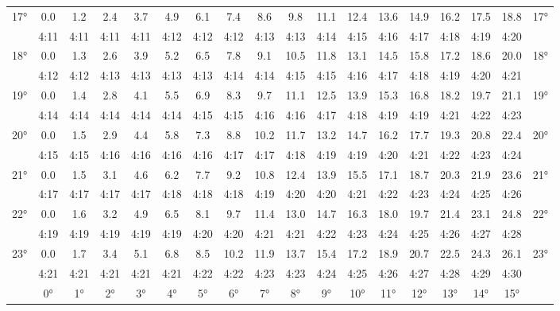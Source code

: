 \begin{footnotesize}
\begin{tabular}{c || c | c | c | c | c | c | c | c | c | c | c | c | c | c | c | c || c}
		\multirow{2}{*}{17°}&0.0&1.2&2.4&3.7&4.9&6.1&7.4&8.6&9.8&11.1&12.4&13.6&14.9&16.2&17.5&18.8&\multirow{2}{*}{17°}\\ \space&4:11&4:11&4:11&4:11&4:12&4:12&4:12&4:13&4:13&4:14&4:15&4:16&4:17&4:18&4:19&4:20&\space\\\hline
		\multirow{2}{*}{18°}&0.0&1.3&2.6&3.9&5.2&6.5&7.8&9.1&10.5&11.8&13.1&14.5&15.8&17.2&18.6&20.0&\multirow{2}{*}{18°}\\ \space&4:12&4:12&4:13&4:13&4:13&4:13&4:14&4:14&4:15&4:15&4:16&4:17&4:18&4:19&4:20&4:21&\space\\\hline
		\multirow{2}{*}{19°}&0.0&1.4&2.8&4.1&5.5&6.9&8.3&9.7&11.1&12.5&13.9&15.3&16.8&18.2&19.7&21.1&\multirow{2}{*}{19°}\\ \space&4:14&4:14&4:14&4:14&4:14&4:15&4:15&4:16&4:16&4:17&4:18&4:19&4:19&4:21&4:22&4:23&\space\\\hline
		\multirow{2}{*}{20°}&0.0&1.5&2.9&4.4&5.8&7.3&8.8&10.2&11.7&13.2&14.7&16.2&17.7&19.3&20.8&22.4&\multirow{2}{*}{20°}\\ \space&4:15&4:15&4:16&4:16&4:16&4:16&4:17&4:17&4:18&4:19&4:19&4:20&4:21&4:22&4:23&4:24&\space\\\hline
		\multirow{2}{*}{21°}&0.0&1.5&3.1&4.6&6.2&7.7&9.2&10.8&12.4&13.9&15.5&17.1&18.7&20.3&21.9&23.6&\multirow{2}{*}{21°}\\ \space&4:17&4:17&4:17&4:17&4:18&4:18&4:18&4:19&4:20&4:20&4:21&4:22&4:23&4:24&4:25&4:26&\space\\\hline
		\multirow{2}{*}{22°}&0.0&1.6&3.2&4.9&6.5&8.1&9.7&11.4&13.0&14.7&16.3&18.0&19.7&21.4&23.1&24.8&\multirow{2}{*}{22°}\\ \space&4:19&4:19&4:19&4:19&4:19&4:20&4:20&4:21&4:21&4:22&4:23&4:24&4:25&4:26&4:27&4:28&\space\\\hline
		\multirow{2}{*}{23°}&0.0&1.7&3.4&5.1&6.8&8.5&10.2&11.9&13.7&15.4&17.2&18.9&20.7&22.5&24.3&26.1&\multirow{2}{*}{23°}\\ \space&4:21&4:21&4:21&4:21&4:21&4:22&4:22&4:23&4:23&4:24&4:25&4:26&4:27&4:28&4:29&4:30&\space\\\hline
		\hline\space &0°&1°&2°&3°&4°&5°&6°&7°&8°&9°&10°&11°&12°&13°&14°&15°
\end{tabular}\end{footnotesize}

